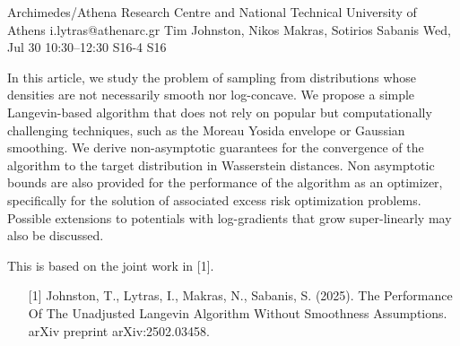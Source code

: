 \begin{talk}
  {Archimedes/Athena Research Centre and National Technical University of Athens}%
  {i.lytras@athenarc.gr}%
  {Tim Johnston, Nikos Makras, Sotirios Sabanis}%
  {}%
  {}%
  {}%
  {Wed, Jul 30 10:30–12:30}%
  {S16-4}%
  {S16}%
  
				
			
In this article, we study the problem of sampling from distributions whose densities are not necessarily smooth nor log-concave. We propose a simple Langevin-based algorithm that does not rely on popular but computationally challenging techniques, such as the Moreau Yosida envelope or Gaussian smoothing. We derive non-asymptotic guarantees for the convergence of the algorithm to the target distribution in Wasserstein distances. Non asymptotic bounds are also provided for the performance of the algorithm as an optimizer, specifically for the solution of associated excess risk optimization problems.\\
Possible extensions to potentials with log-gradients that grow super-linearly may also be discussed.

This is based on the joint work in [1].
\medskip

\begin{enumerate}
    \item [{[1]}] Johnston, T., Lytras, I., Makras, N., Sabanis, S. (2025). The Performance Of The Unadjusted Langevin Algorithm Without Smoothness Assumptions. arXiv preprint arXiv:2502.03458.
\end{enumerate}
\end{talk}

